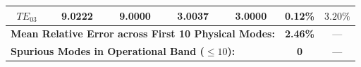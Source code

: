 \documentclass[preprint,12pt]{elsarticle}
\begin{document}
\begin{table}[!t]
{\begin{tabular}{ccccccc}
            $TE_{03}$                                                                        & 9.0222                                                    & 9.0000                                                    & 3.0037                                                 & 3.0000                                                 & \textbf{0.12\%}                                 & $3.20\%$                                      \\
            \midrule
            \multicolumn{5}{l}{\textbf{Mean Relative Error across First 10 Physical Modes:}} & \textbf{2.46\%}                                           & ---                                                                                                                                                                                                                                                                           \\
            \multicolumn{5}{l}{\textbf{Spurious Modes in Operational Band ($\le 10$):}}      & \textbf{0}                                                & ---                                                                                                                                                                                                                                                                           \\
            \bottomrule
        \end{tabular}
    }
\end{table}
\end{document}

